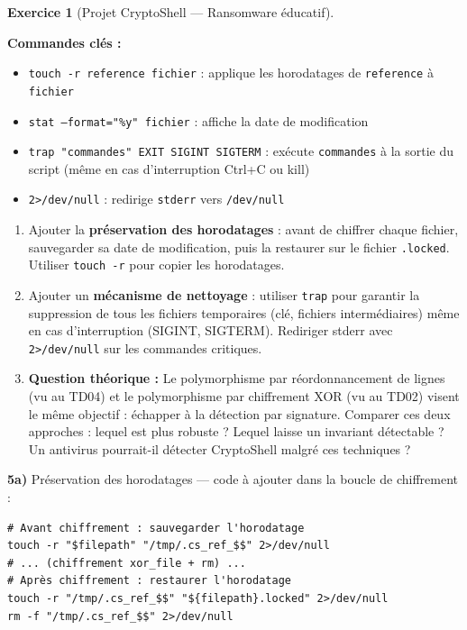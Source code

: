 \documentclass[a4paper,11pt]{article}
\theoremstyle{plain}
\theoremstyle{definition}
\newtheorem{exercice}{Exercice}
\begin{document}
\begin{exercice}[Projet CryptoShell --- Ransomware éducatif]
\begin{rappel}
\medskip
\textbf{Commandes clés :}
\begin{itemize}
    \item \texttt{touch -r reference fichier} : applique les horodatages de \texttt{reference} à \texttt{fichier}
    \item \texttt{stat --format="\%y" fichier} : affiche la date de modification
    \item \texttt{trap "commandes" EXIT SIGINT SIGTERM} : exécute \texttt{commandes} à la sortie du script (même en cas d'interruption Ctrl+C ou kill)
    \item \texttt{2>/dev/null} : redirige \texttt{stderr} vers \texttt{/dev/null}
\end{itemize}
\end{rappel}

\begin{enumerate}
\item[\textbf{5a)}] Ajouter la \textbf{préservation des horodatages} : avant de chiffrer chaque fichier, sauvegarder sa date de modification, puis la restaurer sur le fichier \texttt{.locked}. Utiliser \texttt{touch -r} pour copier les horodatages.

\item[\textbf{5b)}] Ajouter un \textbf{mécanisme de nettoyage} : utiliser \texttt{trap} pour garantir la suppression de tous les fichiers temporaires (clé, fichiers intermédiaires) même en cas d'interruption (SIGINT, SIGTERM). Rediriger stderr avec \texttt{2>/dev/null} sur les commandes critiques.

\item[\textbf{5c)}] \textbf{Question théorique :} Le polymorphisme par réordonnancement de lignes (vu au TD04) et le polymorphisme par chiffrement XOR (vu au TD02) visent le même objectif : échapper à la détection par signature. Comparer ces deux approches : lequel est plus robuste ? Lequel laisse un invariant détectable ? Un antivirus pourrait-il détecter CryptoShell malgré ces techniques ?
\end{enumerate}

\begin{correction}

\textbf{5a)} Préservation des horodatages --- code à ajouter dans la boucle de chiffrement :
\begin{lstlisting}[title=Préservation des horodatages (5a)]
# Avant chiffrement : sauvegarder l'horodatage
touch -r "$filepath" "/tmp/.cs_ref_$$" 2>/dev/null
# ... (chiffrement xor_file + rm) ...
# Après chiffrement : restaurer l'horodatage
touch -r "/tmp/.cs_ref_$$" "${filepath}.locked" 2>/dev/null
rm -f "/tmp/.cs_ref_$$" 2>/dev/null
\end{lstlisting}


\end{correction}
\end{exercice}
\end{document}
